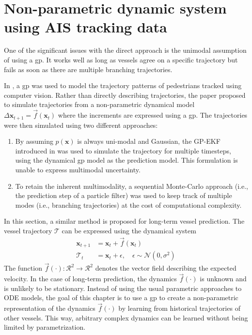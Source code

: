 \chapter{Non-parametric dynamic system using AIS tracking data}
One of the significant issues with the direct approach is the unimodal assumption of using a \acrshort{gp}. It works well as long as vessels agree on a specific trajectory but fails as soon as there are multiple branching trajectories.

In \cite{pedestrian}, a \acrshort{gp} was used to model the trajectory patterns of pedestrians tracked using computer vision. Rather than directly describing trajectories, the paper proposed to simulate trajectories from a non-parametric dynamical model $\Delta\boldsymbol{x}_{t+1} = \vec{f}(\boldsymbol{x}_t)$ where the increments are expressed using a \acrshort{gp}. The trajectories were then simulated using two different approaches:
\begin{enumerate}
    \item By assuming $p(\boldsymbol{x})$ is always uni-modal and Gaussian, the GP-EKF introduced in \cite{gpekf} was used to simulate the trajectory for multiple timesteps, using the dynamical \acrshort{gp} model as the prediction model. This formulation is unable to express multimodal uncertainty.
    \item To retain the inherent multimodality, a sequential Monte-Carlo approach (i.e., the prediction step of a particle filter) was used to keep track of multiple modes (i.e., branching trajectories) at the cost of computational complexity.
\end{enumerate}

In this section, a similar method is proposed for long-term vessel prediction. The vessel trajectory $\boldsymbol{\mathcal{T}}$ can be expressed using the dynamical system
\begin{subequations}
    \begin{align}
        \boldsymbol{x}_{t+1} & = \boldsymbol{x}_t + \vec{f}(\boldsymbol{x}_t)                              \\
        \mathcal{T}_t        & = \boldsymbol{x}_t + \epsilon, \quad \epsilon \sim \mathcal{N}(0, \sigma^2)
    \end{align}
\end{subequations}
The function $\vec{f}(\cdot): \mathcal{R}^2 \to \mathcal{R}^2$ denotes the vector field describing the expected velocity. In the case of long-term prediction, the dynamics $\vec{f}(\cdot)$ is unknown and is unlikely to be stationary. Instead of using the usual parametric approaches to ODE models, the goal of this chapter is to use a \acrshort{gp} to create a non-parametric representation of the dynamics $\vec{f}(\cdot)$ by learning from historical trajectories of other vessels. This way, arbitrary complex dynamics can be learned without being limited by parametrization.


